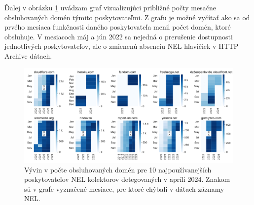 \begin{table}[!htb]
\centering
{}
\caption{Detaily pre 10 najpoužívanejších poskytovateľov NEL kolektorov za apríl 2024.}
\label{tab:top-10-latest-nel-collector-providers-stats}
\end{table}

Ďalej v obrázku \ref{fig:httparchive-nel-latest-collector-provider-stats} uvádzam graf vizualizujúci približné počty mesačne obsluhovaných domén týmito poskytovateľmi. 
Z grafu je možné vyčítať ako sa od prvého mesiaca funkčnosti daného poskytovateľa menil počet domén, ktoré obsluhuje.
V mesiacoch máj a jún 2022 sa nejedná o prerušenie dostupnosti jednotlivých poskytovateľov, ale o zmienenú absenciu NEL hlavičiek v HTTP Archive dátach.

\begin{figure}[!htb]
\begin{center}
 \includegraphics[scale=0.54]{obrazky-figures/httparchive_nel_latest_collector_provider_stats.pdf}
 \caption{Vývin v počte obsluhovaných domén pre 10 najpoužívanejších poskytovateľov NEL kolektorov detegovaných v apríli 2024. Znakom  sú v grafe vyznačené mesiace, pre ktoré chýbali v dátach záznamy NEL.}
 \label{fig:httparchive-nel-latest-collector-provider-stats}
\end{center}
\end{figure}

